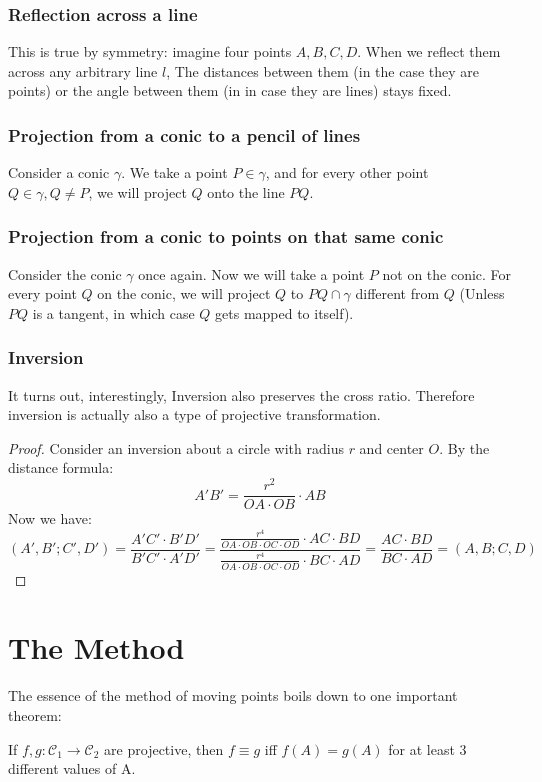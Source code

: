 \documentclass{article}
\theoremstyle{mytheoremstyle}
\theoremstyle{mytheoremstyle}
\theoremstyle{myproblemstyle}
\begin{document}
    \subsubsection{Reflection across a line}
    This is true by symmetry: imagine four points $A, B, C, D$. When we reflect them across any arbitrary line $l$, The distances between them (in the case they are points) or the angle between them (in in case they are lines) stays fixed.

    \subsubsection{Projection from a conic to a pencil of lines}

    Consider a conic $\gamma$. We take a point $P \in \gamma$, and for every other point $Q \in \gamma, Q \not= P$, we will project $Q$ onto the line $PQ$. 

    \subsubsection{Projection from a conic to points on that same conic}
    Consider the conic $\gamma$ once again. Now we will take a point $P$ not on the conic. For every point $Q$ on the conic, we will project $Q$ to $PQ \cap \gamma$ different from $Q$ (Unless $PQ$ is a tangent, in which case $Q$ gets mapped to itself).

    \subsubsection{Inversion}
    It turns out, interestingly, Inversion also preserves the cross ratio. Therefore inversion is actually also a type of projective transformation.
    \begin{proof}
        Consider an inversion about a circle with radius $r$ and center $O$. By the distance formula: \[A'B' = \frac{r^2}{OA \cdot OB} \cdot AB\]
        Now we have: 
        \[(A', B'; C', D') = \frac{A'C' \cdot B'D'}{B'C' \cdot A'D'} = \frac{\frac{r^4}{OA \cdot OB \cdot OC \cdot OD} \cdot AC \cdot BD}{\frac{r^4}{OA \cdot OB \cdot OC \cdot OD} \cdot BC \cdot AD} = \frac{AC \cdot BD}{BC \cdot AD} = (A, B; C, D)\]
    \end{proof}

    \section{The Method}
    The essence of the method of moving points boils down to one important theorem:
    \begin{theorem}
        If $f, g: \mathcal{C}_1 \to \mathcal{C}_2$ are projective, then $f \equiv g$ iff $f(A)=g(A)$ for at least 3 different values of A. 
    \end{theorem}
\end{document}
